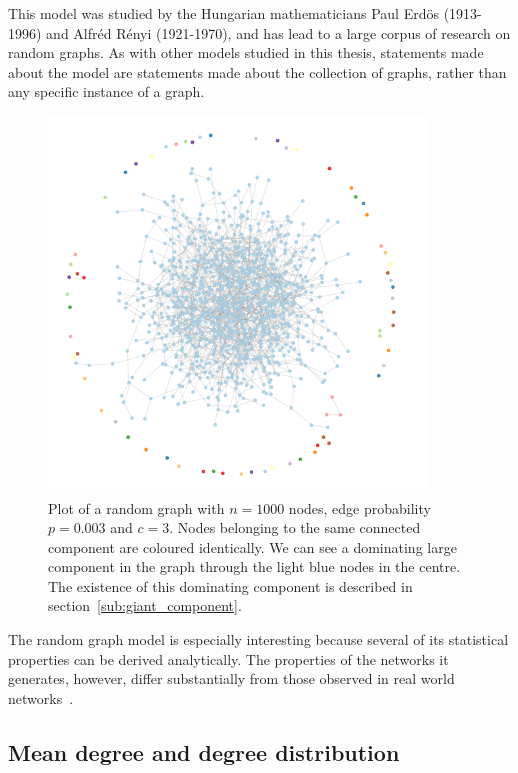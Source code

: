 This model was studied by the Hungarian mathematicians Paul Erd\"os (1913-1996) and Alfr\'ed R\'enyi (1921-1970), and has lead to a large corpus of research on random graphs.
As with other models studied in this thesis, statements made about the model are statements made about the collection of graphs, rather than any specific instance of a graph.

\begin{figure}[tb]
	\centering
	\includegraphics[width=10cm]{figures/gnp_hairball.png}
	\caption[Plot of a random graph with a dominating giant component]{Plot of a random graph with $n = 1000$ nodes, edge probability $p = 0.003$ and $c=3$. 
	Nodes belonging to the same connected component are coloured identically.
	We can see a dominating large component in the graph through the light blue nodes in the centre.
	The existence of this dominating component is described in section~\ref{sub:giant_component}.}
	\label{fig:hairball}
\end{figure}

The random graph model is especially interesting because several of its statistical properties can be derived analytically.
The properties of the networks it generates, however, differ substantially from those observed in real world networks~\cite{Albert:2002p4071}.

\subsection{Mean degree and degree distribution} %
\label{ssub:mean_degree_and_degree_distribution}

